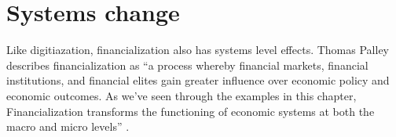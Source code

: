 
\section{Systems change}



Like digitiazation, financialization also has systems level effects. Thomas Palley describes financialization as ``a process whereby financial markets, financial institutions, and financial elites gain greater influence over economic policy and economic outcomes. As we've seen through the examples in this chapter, Financialization transforms the functioning of economic systems at both the macro and micro levels'' \cite{palleyFinancializationWhatIt2007}. 

